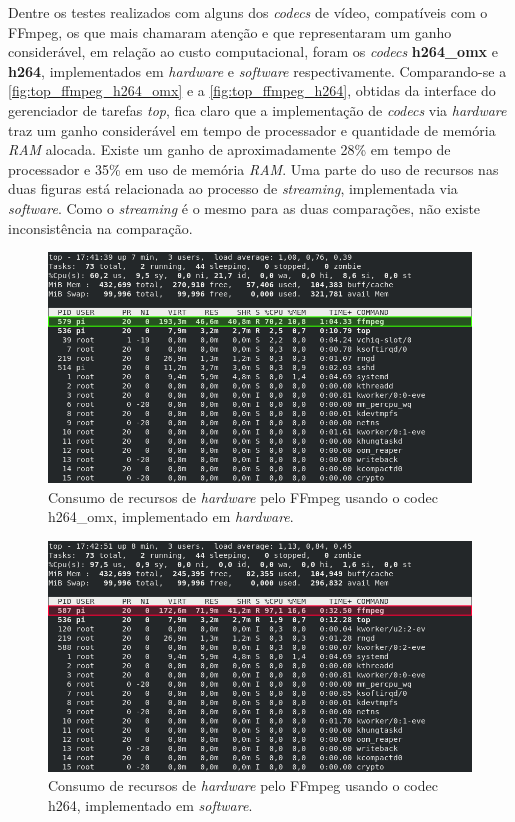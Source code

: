 Dentre os testes realizados com alguns dos \textit{codecs} de vídeo, compatíveis com o FFmpeg, os que mais chamaram atenção e que representaram um ganho considerável, em relação ao custo computacional, foram os \textit{codecs} \textbf{h264\_omx} e \textbf{h264}, implementados em \textit{hardware} e \textit{software} respectivamente.
Comparando-se a \autoref{fig:top_ffmpeg_h264_omx} e a \autoref{fig:top_ffmpeg_h264}, obtidas da interface do gerenciador de tarefas \textit{top}, fica claro que a implementação de \textit{codecs} via \textit{hardware} traz um ganho considerável em tempo de processador e quantidade de memória \textit{RAM} alocada. Existe um ganho de aproximadamente 28\% em tempo de processador e 35\% em uso de memória \textit{RAM}. Uma parte do uso de recursos nas duas figuras está relacionada ao processo de \textit{streaming}, implementada via \textit{software}. Como o \textit{streaming} é o mesmo para as duas comparações, não existe inconsistência na comparação.

\begin{figure}[H]
	\centering
	\includegraphics[width=1\textwidth]{figuras/top_ffmpeg_h264_omx.png}
	\caption{Consumo de recursos de \textit{hardware} pelo FFmpeg usando o codec h264\_omx, implementado em \textit{hardware}.}
	\label{fig:top_ffmpeg_h264_omx}
\end{figure}

\begin{figure}[H]
	\centering
	\includegraphics[width=1\textwidth]{figuras/top_ffmpeg_h264.png}
	\caption{Consumo de recursos de \textit{hardware} pelo FFmpeg usando o codec h264, implementado em \textit{software}.}
	\label{fig:top_ffmpeg_h264}
\end{figure}
